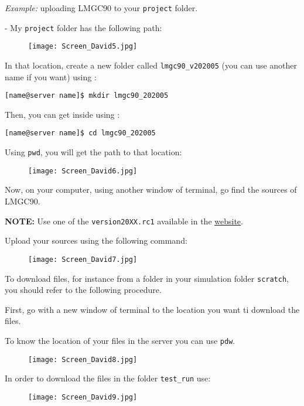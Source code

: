 \documentclass[12pt]{article}
\begin{document}
\textit{Example:} uploading LMGC90 to your \texttt{project} folder.

    - My \texttt{project} folder has the following path:
\begin{figure}[H]
  \centering
  \texttt{[image: Screen\_David5.jpg]}
\end{figure}

In that location, create a new folder called \texttt{lmgc90\_v202005} (you can use another name if you want) using :
\begin{tcolorbox}
\texttt{[name@server name]\$ mkdir lmgc90\_202005}
\end{tcolorbox}

Then, you can get inside using :
\begin{tcolorbox}
\texttt{[name@server name]\$ cd lmgc90\_202005}
\end{tcolorbox}

Using \texttt{pwd}, you will get the path to that location:
\begin{figure}[H]
  \centering
  \texttt{[image: Screen\_David6.jpg]}
\end{figure}

Now, on your computer, using another window of terminal, go find the sources of LMGC90.

\textbf{NOTE:} Use one of the \texttt{version20XX.rc1} available in the \href{https://git-xen.lmgc.univ-montp2.fr/lmgc90/lmgc90_user/-/wikis/download_and_install}{\underline{website}}.

Upload your sources using the following command:
\begin{figure}[H]
  \centering
  \texttt{[image: Screen\_David7.jpg]}
\end{figure}

To download files, for instance from a folder in your simulation folder \texttt{scratch}, you should refer to the following procedure.

First, go with a new window of terminal to the location you want ti download the files.

To know the location of your files in the server you can use \texttt{pdw}.
\begin{figure}[H]
  \centering
  \texttt{[image: Screen\_David8.jpg]}
\end{figure}

In order to download the files in the folder \texttt{test\_run} use:
\begin{figure}[H]
  \centering
  \texttt{[image: Screen\_David9.jpg]}
\end{figure}
\end{document}
